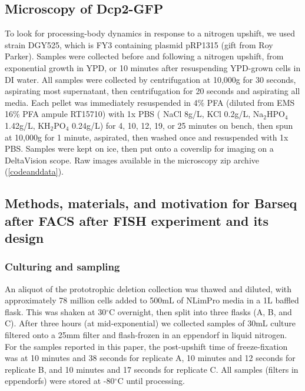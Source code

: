 \subsection{Microscopy of Dcp2-GFP}

To look for processing-body dynamics in response to
a nitrogen upshift, we used strain DGY525, which is FY3
containing plasmid pRP1315 (gift from Roy Parker).
Samples were collected before and following a nitrogen upshift,
from exponential growth in YPD, or 10 minutes after resuspending
YPD-grown cells in DI water.
All samples were collected by centrifugation at 10,000g for 30 seconds, 
aspirating most supernatant, then centrifugation for 20 seconds
and aspirating all media. Each pellet was 
immediately resuspended in 4\% PFA 
(diluted from EMS 16\% PFA ampule RT15710) 
with 1x PBS ( NaCl 8g/L, KCl 0.2g/L, Na$_2$HPO$_4$ 1.42g/L, 
KH$_2$PO$_4$ 0.24g/L) for 4, 10, 12, 19, or 25
minutes on bench, then spun at 10,000g for 1 minute, aspirated, 
then washed once and resuspended with 1x PBS. 
Samples were kept on ice, then put onto a coverslip
for imaging on a DeltaVision scope. Raw images available in the
microscopy zip archive (\autoref{codeanddata}).

\subsection{Methods, materials, and motivation for Barseq after 
FACS after FISH experiment and its design}

\label{subsection:bff}

\subsubsection{Culturing and sampling}

An aliquot of the prototrophic deletion collection
\parencite{vandersluis2014broad} was thawed and diluted, with 
approximately 78 million cells added to 500mL of NLimPro media 
in a 1L baffled flask. This was shaken at 30$^{\circ}$C overnight, 
then split into three flasks (A, B, and C). 
After three hours (at mid-exponential)
we collected samples of 30mL culture filtered onto a 25mm filter and
flash-frozen in an eppendorf in liquid nitrogen. 
For the samples reported in this paper, the
post-upshift time of freeze-fixation was at 10 minutes and 38 seconds
for replicate A, 10 minutes and 12 seconds for replicate B, and 10
minutes and 17 seconds for replicate C. All samples (filters in
eppendorfs) were stored at -80\(^{\circ}\)C until processing.

